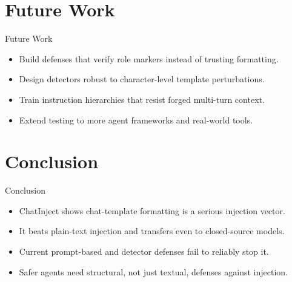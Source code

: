 \documentclass[10pt]{beamer}
\begin{document}
\section{Future Work}
\begin{frame}{Future Work}
\begin{itemize}
  \item Build defenses that verify role markers instead of trusting formatting.
  \item Design detectors robust to character-level template perturbations.
  \item Train instruction hierarchies that resist forged multi-turn context.
  \item Extend testing to more agent frameworks and real-world tools.
\end{itemize}
\end{frame}
\section{Conclusion}
\begin{frame}{Conclusion}
\begin{itemize}
  \item ChatInject shows chat-template formatting is a serious injection vector.
  \item It beats plain-text injection and transfers even to closed-source models.
  \item Current prompt-based and detector defenses fail to reliably stop it.
  \item Safer agents need structural, not just textual, defenses against injection.
\end{itemize}
\end{frame}
\end{document}
